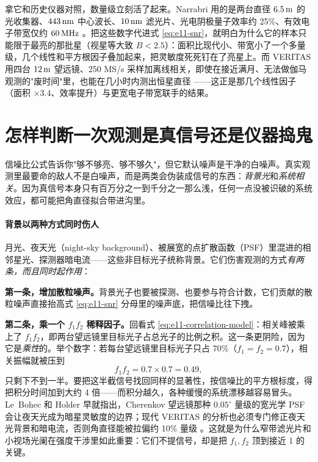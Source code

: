 拿它和历史仪器对照，数量级立刻活了起来。Narrabri 用的是两台直径 \(6.5\,{\rm m}\) 的光收集器、\(443\,{\rm nm}\) 中心波长、\(10\,{\rm nm}\) 滤光片、光电阴极量子效率约 25\%、有效电子带宽仅约 \(60\,{\rm MHz}\) \citep{1967MNRAS.137..375H,1974MNRAS.167..121H,1974iiia.book.....H}。把这些数字代进式 \eqref{eq:e11-snr}，就明白为什么它的样本只能限于最亮的那批星（视星等大致 \(B<2.5\)）：面积比现代小、带宽小了一个多量级，几个线性和平方根因子叠加起来，把灵敏度死死钉在了亮星上。而 VERITAS 用四台 \(12\,{\rm m}\) 望远镜、250 MS/s 采样加离线相关，即使在接近满月、无法做伽马观测的"废时间"里，也能在几小时内测出恒星直径 \citep{2020NatAs...4.1164A}——这正是那几个线性因子（面积 \(\times3.4\)、效率提升）与更宽电子带宽联手的结果。

\section{怎样判断一次观测是真信号还是仪器捣鬼}
\label{sec:e11-feasibility}

信噪比公式告诉你"够不够亮、够不够久"，但它默认噪声是干净的白噪声。真实观测里最要命的敌人不是白噪声，而是两类会伪装成信号的东西：\emph{背景光}和\emph{系统相关}。因为真信号本身只有百万分之一到千分之一那么浅，任何一点没被识破的系统效应，都可能把角直径拟合带进沟里。

\paragraph{背景以两种方式同时伤人}
\label{sec:e11-background}

月光、夜天光（night-sky background）、被展宽的点扩散函数（PSF）里混进的相邻星光、探测器暗电流——这些非目标光子统称背景。它们伤害观测的方式\emph{有两条，而且同时起作用}：

\textbf{第一条，增加散粒噪声。}背景光子也要被探测、也要参与符合计数，它们贡献的散粒噪声直接抬高式 \eqref{eq:e11-snr} 分母里的噪声底，把信噪比往下拽。

\textbf{第二条，乘一个 \(f_1f_2\) 稀释因子。}回看式 \eqref{eq:e11-correlation-model}：相关峰被乘上了 \(f_1f_2\)，即两台望远镜里目标光子占总光子的比例之积。这一条更阴险，因为它是\emph{乘性}的。举个数字：若每台望远镜里目标光子只占 70\%（\(f_1=f_2=0.7\)），相关振幅就被压到
\[
  f_1 f_2 = 0.7\times0.7 = 0.49,
\]
只剩下不到一半。要把这半截信号找回同样的显著性，按信噪比的平方根标度，得把积分时间加到大约 4 倍——而积分越久，各种缓慢的系统漂移越容易冒头。Le~Bohec 和 Holder 早就指出，Cherenkov 望远镜那种 \(0.05^\circ\) 量级的宽光学 PSF 会让夜天光成为暗星灵敏度的边界；现代 VERITAS 的分析也必须专门修正夜天光背景和暗电流，否则角直径能被拉偏约 10\% 量级 \citep{2006ApJ...649..399L,2020NatAs...4.1164A,2025ApJ...995..191A}。这就是为什么窄带滤光片和小视场光阑在强度干涉里如此重要：它们不提信号，却是把 \(f_1,f_2\) 顶到接近 1 的关键。

